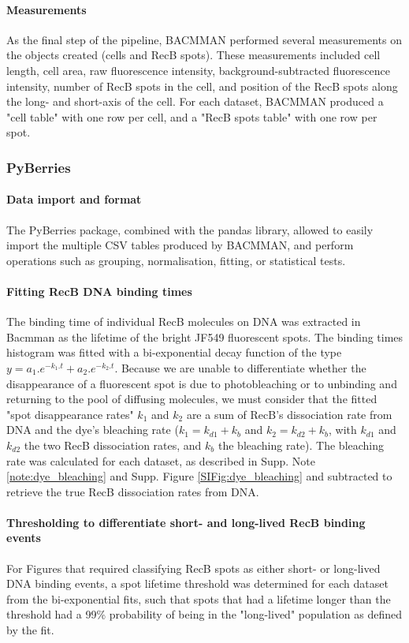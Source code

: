 \paragraph*{Measurements}
As the final step of the pipeline, BACMMAN performed several measurements on the objects created (cells and RecB spots). These measurements included cell length, cell area, raw fluorescence intensity, background-subtracted fluorescence intensity, number of RecB spots in the cell, and position of the RecB spots along the long- and short-axis of the cell. For each dataset, BACMMAN produced a "cell table" with one row per cell, and a "RecB spots table" with one row per spot.

\subsubsection*{PyBerries}
\paragraph*{Data import and format}
The PyBerries package, combined with the pandas library, allowed to easily import the multiple CSV tables produced by BACMMAN, and perform operations such as grouping, normalisation, fitting, or statistical tests.

\paragraph*{Fitting RecB DNA binding times}
The binding time of individual RecB molecules on DNA was extracted in Bacmman as the lifetime of the bright JF549 fluorescent spots. The binding times histogram was fitted with a bi-exponential decay function of the type $y=a_1.e^{-k_1.t} + a_2.e^{-k_2.t}$. Because we are unable to differentiate whether the disappearance of a fluorescent spot is due to photobleaching or to unbinding and returning to the pool of diffusing molecules, we must consider that the fitted "spot disappearance rates" $k_1$ and $k_2$ are a sum of RecB's dissociation rate from DNA and the dye's bleaching rate ($k_1=k_{d1}+k_b$ and $k_2=k_{d2}+k_b$, with $k_{d1}$ and $k_{d2}$ the two RecB dissociation rates, and $k_b$ the bleaching rate). The bleaching rate was calculated for each dataset, as described in Supp. Note \ref{note:dye_bleaching} and Supp. Figure \ref{SIFig:dye_bleaching} and subtracted to retrieve the true RecB dissociation rates from DNA.

\paragraph*{Thresholding to differentiate short- and long-lived RecB binding events}
For Figures that required classifying RecB spots as either short- or long-lived DNA binding events, a spot lifetime threshold was determined for each dataset from the bi-exponential fits, such that spots that had a lifetime longer than the threshold had a 99\% probability of being in the "long-lived" population as defined by the fit.

